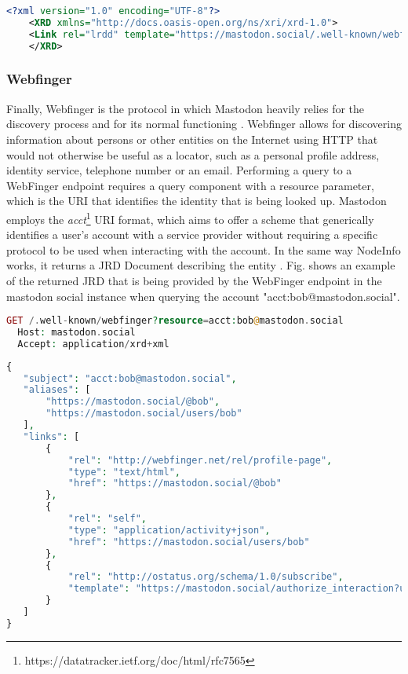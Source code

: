 \lstset{style=JSONStyle}
\begin{lstlisting}[language=XML, caption=Host metadata response from mastodon.social, label=host_metadata_response]
    <?xml version="1.0" encoding="UTF-8"?>
    <XRD xmlns="http://docs.oasis-open.org/ns/xri/xrd-1.0">
    <Link rel="lrdd" template="https://mastodon.social/.well-known/webfinger?resource={uri}"/>
    </XRD>
\end{lstlisting}

\subsubsection{Webfinger}
Finally, Webfinger is the protocol in which Mastodon heavily relies for the discovery process and for its normal functioning \cite{rochko_2020}. Webfinger allows for discovering information about persons or other entities on the Internet using HTTP that would not otherwise be useful as a locator, such as a personal profile address, identity service, telephone number or an email. Performing a query to a WebFinger endpoint requires a query component with a resource parameter, which is the URI that identifies the identity that is being looked up. Mastodon employs the \emph{acct}\footnote{https://datatracker.ietf.org/doc/html/rfc7565} URI format, which aims to offer a scheme that generically identifies a user's account with a service provider without requiring a specific protocol to be used when interacting with the account. In the same way NodeInfo works, it returns a JRD Document describing the entity \cite{jones_salgueiro_jones_smarr_2013}.  Fig. \label{Webfinger response from mastodon.social} shows an example of the returned JRD that is being provided by the WebFinger endpoint in the mastodon social instance when querying the account "acct:bob@mastodon.social".

\lstset{style=JSONStyle}
\begin{lstlisting}[language=PHP, caption=HTTP request to Webfinger endpoint, label=Webfinger request]
  GET /.well-known/webfinger?resource=acct:bob@mastodon.social
  Host: mastodon.social
  Accept: application/xrd+xml
\end{lstlisting}

\begin{lstlisting}[language=PHP, caption=Webfinger response, label=Webfinger response from mastodon.social]
{
   "subject": "acct:bob@mastodon.social",
   "aliases": [
       "https://mastodon.social/@bob",
       "https://mastodon.social/users/bob"
   ],
   "links": [
       {
           "rel": "http://webfinger.net/rel/profile-page",
           "type": "text/html",
           "href": "https://mastodon.social/@bob"
       },
       {
           "rel": "self",
           "type": "application/activity+json",
           "href": "https://mastodon.social/users/bob"
       },
       {
           "rel": "http://ostatus.org/schema/1.0/subscribe",
           "template": "https://mastodon.social/authorize_interaction?uri={uri}"
       }
   ]
}
\end{lstlisting}

